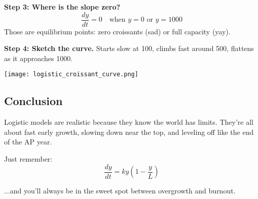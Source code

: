 \documentclass{article}
\begin{document}
\textbf{Step 3: Where is the slope zero?}  
\[
\frac{dy}{dt} = 0 \quad \text{when } y = 0 \text{ or } y = 1000
\]
Those are equilibrium points: zero croissants (sad) or full capacity (yay).

\textbf{Step 4: Sketch the curve.}  
Starts slow at 100, climbs fast around 500, flattens as it approaches 1000.

\begin{center}
\texttt{[image: logistic\_croissant\_curve.png]}
\end{center}

\subsection*{Conclusion}
Logistic models are realistic because they know the world has limits.  
They’re all about fast early growth, slowing down near the top, and leveling off like the end of the AP year.

Just remember:  
\[
\frac{dy}{dt} = ky\left(1 - \frac{y}{L}\right)
\]

...and you’ll always be in the sweet spot between overgrowth and burnout. 
\end{document}
